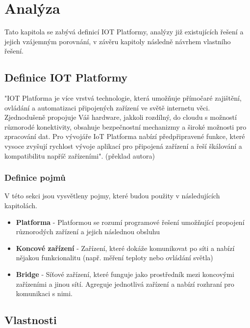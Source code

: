\chapter{Analýza}
Tato kapitola se zabývá definicí IOT Platformy, analýzy již existujících řešení a jejich vzájemným porovnání, v závěru kapitoly následně návrhem vlastního řešení.


\section{Definice IOT Platformy}
"IOT Platforma je více vrstvá technologie, která umožňuje přímočaré zajištění, ovládání a automatizaci připojených zařízení ve světě internetu věci. Zjednodušeně propojuje Váš hardware, jakkoli rozdílný, do cloudu s možností různorodé konektivity, obsahuje bezpečnostní mechanizmy a široké možnosti pro zpracování dat. Pro vývojáře IoT Platforma nabízí předpřipravené funkce, které vysoce zvyšují rychlost vývoje aplikací pro připojená zařízení a řeší škálování a kompatibilitu napříč zařízeními". (překlad autora) \cite{kaaproject}

\subsection{Definice pojmů}
V této sekci jsou vysvětleny pojmy, které budou použity v následujících kapitolách.

\begin{itemize}
    \item \textbf{Platforma} - Platformou se rozumí programové řešení umožňující propojení různorodých zařízení a jejich následnou obsluhu
    \item \textbf{Koncové zařízení} - Zařízení, které dokáže komunikovat po síti a nabízí nějakou funkcionalitu (např. měření teploty nebo ovládání světla)
    \item \textbf{Bridge} - Síťové zařízení, které funguje jako prostředník mezi koncovými zařízeními a jinou sítí. Agreguje jednotlivá zařízení a nabízí rozhraní pro komunikaci s nimi.
\end{itemize}


\section{Vlastnosti}


